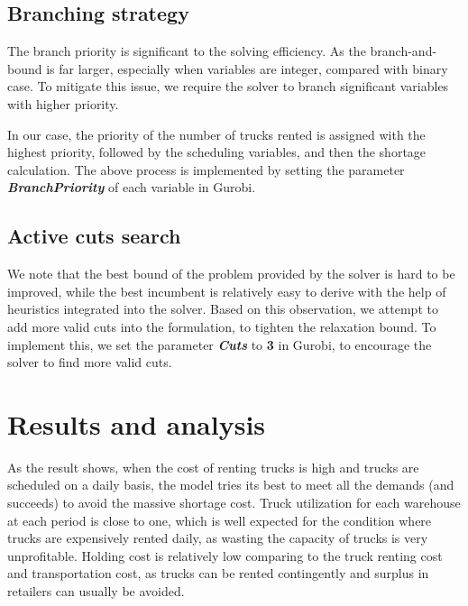 \documentclass[a4paper,12pt]{article}
\begin{document}
\subsection{Branching strategy}\label{subsec:branching-strategy}
The branch priority is significant to the solving efficiency.
As the branch-and-bound is far larger, especially when variables are integer, compared with binary case.
To mitigate this issue, we require the solver to branch significant variables with higher priority.

In our case, the priority of the number of trucks rented is assigned with the highest priority, followed by the scheduling variables, and then the shortage calculation.
The above process is implemented by setting the parameter \textbf{\textit{BranchPriority}} of each variable in Gurobi.

\subsection{Active cuts search}
We note that the best bound of the problem provided by the solver
is hard to be improved, while the best incumbent is relatively easy to derive with the help of heuristics integrated into the solver.
Based on this observation, we attempt to add more valid cuts into the formulation, to tighten the relaxation bound.
To implement this, we set the parameter \textbf{\textit{Cuts}} to \textbf{3} in Gurobi, to encourage the solver to find more valid cuts.











\section{Results and analysis}\label{sec:results-and-analysis}

As the result shows, when the cost of renting trucks is high and trucks are scheduled on a daily basis, the model tries its best to meet all the demands (and succeeds) to avoid the massive shortage cost. Truck utilization for each warehouse at each period is close to one, which is well expected for the condition where trucks are expensively rented daily, as wasting the capacity of trucks is very unprofitable. Holding cost is relatively low comparing to the truck renting cost and transportation cost, as trucks can be rented contingently and surplus in retailers can usually be avoided.
\end{document}
